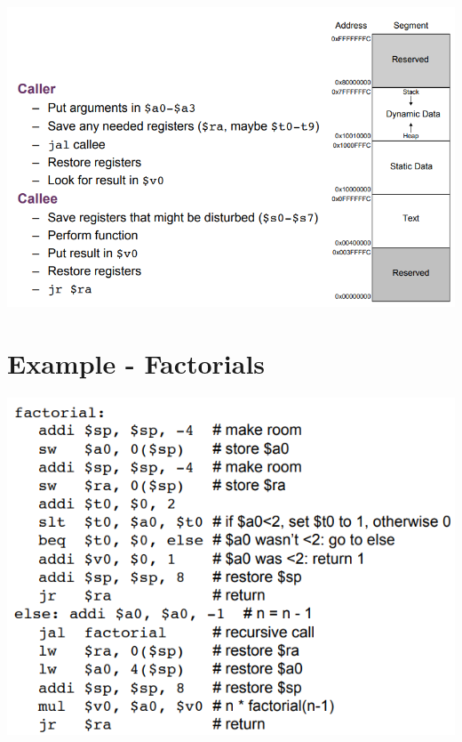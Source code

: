 \documentclass{article}[18pt]
\begin{document}
\includegraphics[scale=0.7]{Conventions3}
\section{Example - Factorials}
\includegraphics[scale=0.7]{Example}
\end{document}
